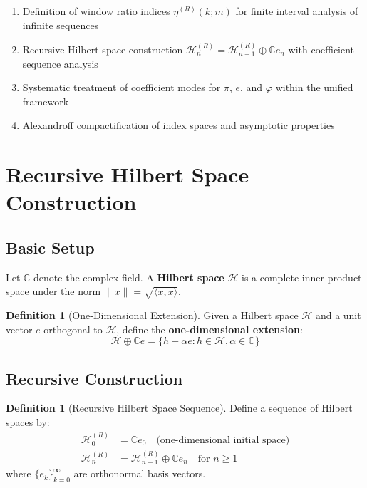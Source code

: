 \documentclass[12pt]{article}
\theoremstyle{plain}
\theoremstyle{definition}
\newtheorem{definition}[theorem]{Definition}
\begin{document}
\begin{enumerate}
\item Definition of window ratio indices $\eta^{(R)}(k; m)$ for finite interval analysis of infinite sequences
\item Recursive Hilbert space construction $\mathcal{H}_n^{(R)} = \mathcal{H}_{n-1}^{(R)} \oplus \mathbb{C} e_n$ with coefficient sequence analysis
\item Systematic treatment of coefficient modes for $\pi$, $e$, and $\varphi$ within the unified framework
\item Alexandroff compactification of index spaces and asymptotic properties
\end{enumerate}

\section{Recursive Hilbert Space Construction}

\subsection{Basic Setup}

Let $\mathbb{C}$ denote the complex field. A \textbf{Hilbert space} $\mathcal{H}$ is a complete inner product space under the norm $\|x\| = \sqrt{\langle x, x \rangle}$.

\begin{definition}[One-Dimensional Extension]
Given a Hilbert space $\mathcal{H}$ and a unit vector $e$ orthogonal to $\mathcal{H}$, define the \textbf{one-dimensional extension}:
$$\mathcal{H} \oplus \mathbb{C} e = \{h + \alpha e : h \in \mathcal{H}, \alpha \in \mathbb{C}\}$$
\end{definition}

\subsection{Recursive Construction}

\begin{definition}[Recursive Hilbert Space Sequence]
Define a sequence of Hilbert spaces by:
\begin{align}
\mathcal{H}_0^{(R)} &= \mathbb{C} e_0 \quad \text{(one-dimensional initial space)} \\
\mathcal{H}_n^{(R)} &= \mathcal{H}_{n-1}^{(R)} \oplus \mathbb{C} e_n \quad \text{for } n \geq 1
\end{align}
where $\{e_k\}_{k=0}^\infty$ are orthonormal basis vectors.
\end{definition}
\end{document}
